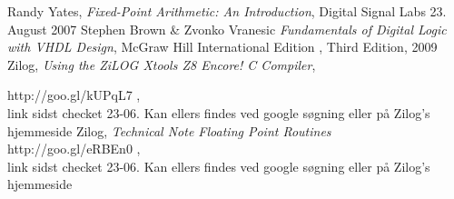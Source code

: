 \documentclass[12pt,a4paper]{article}
\begin{document}







%
%

%
\renewcommand{\refname}{\normalfont\selectfont\normalsize Kildeliste} 
\begin{thebibliography}{9}

   Randy Yates,
  \emph{Fixed-Point Arithmetic: An Introduction},
   Digital Signal Labs
  23. August
  2007
	Stephen Brown \& Zvonko Vranesic
	\emph{Fundamentals of Digital Logic with VHDL Design},
	McGraw Hill International Edition , Third Edition,
	2009
	Zilog,
 \emph{Using the ZiLOG Xtools Z8 Encore! C Compiler},

	http://goo.gl/kUPqL7 , \\ 
	link sidst checket 23-06. Kan ellers findes ved google søgning eller på Zilog's hjemmeside
	Zilog,
	\emph{Technical Note 
Floating Point Routines} \\
	http://goo.gl/eRBEn0 , \\
	link sidst checket 23-06. Kan ellers findes ved google søgning eller på Zilog's hjemmeside
\end{thebibliography}
\end{document}
